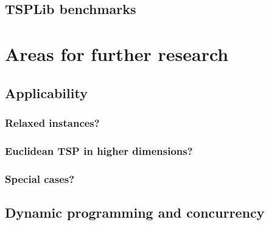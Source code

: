 \documentclass[10pt,a4paper]{scrartcl}
\begin{document}
\subsection{TSPLib benchmarks}

\section{Areas for further research}
\subsection{Applicability}
\subsubsection{Relaxed instances?}
\subsubsection{Euclidean TSP in higher dimensions?}
\subsubsection{Special cases?}
\subsection{Dynamic programming and concurrency}
%
\end{document}
